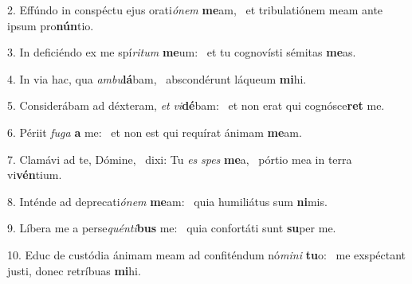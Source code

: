 2. Effúndo in conspéctu ejus orati\textit{ó}\textit{nem} \textbf{me}am, \ast\  et tribulatiónem meam ante ipsum pro\textbf{nún}tio.\

3. In deficiéndo ex me spí\textit{ri}\textit{tum} \textbf{me}um: \ast\  et tu cognovísti sémitas \textbf{me}as.\

4. In via hac, qua \textit{am}\textit{bu}\textbf{lá}bam, \ast\  abscondérunt láqueum \textbf{mi}hi.\

5. Considerábam ad déxteram, \textit{et} \textit{vi}\textbf{dé}bam: \ast\  et non erat qui cognósce\textbf{ret} me.\

6. Périit \textit{fu}\textit{ga} \textbf{a} me: \ast\  et non est qui requírat ánimam \textbf{me}am.\

7. Clamávi ad te, Dómine, \dag\  dixi: Tu \textit{es} \textit{spes} \textbf{me}a, \ast\  pórtio mea in terra vi\textbf{vén}tium.\

8. Inténde ad deprecati\textit{ó}\textit{nem} \textbf{me}am: \ast\  quia humiliátus sum \textbf{ni}mis.\

9. Líbera me a perse\textit{quén}\textit{ti}\textbf{bus} me: \ast\  quia confortáti sunt \textbf{su}per me.\

10. Educ de custódia ánimam meam ad confiténdum nó\textit{mi}\textit{ni} \textbf{tu}o: \ast\  me exspéctant justi, donec retríbuas \textbf{mi}hi.\

